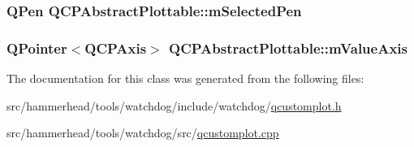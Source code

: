 \subsubsection[{\texorpdfstring{m\+Selected\+Pen}{mSelectedPen}}]{\setlength{\rightskip}{0pt plus 5cm}Q\+Pen Q\+C\+P\+Abstract\+Plottable\+::m\+Selected\+Pen\hspace{0.3cm}{\ttfamily [protected]}}\hypertarget{classQCPAbstractPlottable_a10619472f5d5e10e9519a599f1cf5576}{}\label{classQCPAbstractPlottable_a10619472f5d5e10e9519a599f1cf5576}
\subsubsection[{\texorpdfstring{m\+Value\+Axis}{mValueAxis}}]{\setlength{\rightskip}{0pt plus 5cm}Q\+Pointer$<${\bf Q\+C\+P\+Axis}$>$ Q\+C\+P\+Abstract\+Plottable\+::m\+Value\+Axis\hspace{0.3cm}{\ttfamily [protected]}}\hypertarget{classQCPAbstractPlottable_a2901452ca4aea911a1827717934a4bda}{}\label{classQCPAbstractPlottable_a2901452ca4aea911a1827717934a4bda}


The documentation for this class was generated from the following files\+:\begin{DoxyCompactItemize}
\item 
src/hammerhead/tools/watchdog/include/watchdog/\hyperlink{qcustomplot_8h}{qcustomplot.\+h}\item 
src/hammerhead/tools/watchdog/src/\hyperlink{qcustomplot_8cpp}{qcustomplot.\+cpp}\end{DoxyCompactItemize}
